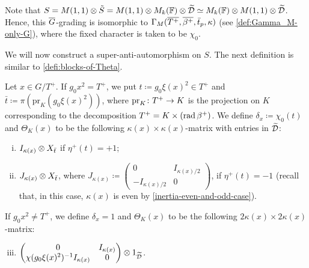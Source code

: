 \begin{remark}\label{rmk:change-M(1-1)-of-place}
    Note that $S = M(1,1) \otimes \tilde S = M(1,1) \otimes M_k(\mathbb{F}) \otimes \widetilde {\mathcal{D}} \simeq M_k(\mathbb{F}) \otimes M(1,1) \otimes \widetilde{\mathcal{D}}$. 
    Hence, this $\barr G$-grading is isomorphic to $\Gamma_M(\barr {T^+}, \barr {\beta^+}, \bar t_p, \kappa)$ (see \cref{def:Gamma_M-only-G}), where the fixed character is taken to be $\chi_0$. 
\end{remark}

We will now construct a super-anti-automorphism on $S$. 
The next definition is similar to \cref{defi:blocks-of-Theta}. 

\begin{defi}\label{defi:blocks-of-Theta-Ann}
    Let $x \in G/T^+$. 
    If $g_0x^2 = T^+$, we put $t \coloneqq g_0 \xi(x)^2 \in T^+$ and $\bar t \coloneqq \pi(\mathrm{pr}_{K} (g_0 \xi(x)^2) )$, where $\mathrm{pr}_{K}\colon {T^+} \to K$ is the projection on $K$ corresponding to the decomposition ${T^+} = K \times (\operatorname{rad} \beta^+)$. 
    We define $\delta_x \coloneqq \chi_0(t)$ and $\Theta_K(x)$ to be the following $\kappa(x) \times \kappa(x)$-matrix with entries in $\widetilde {\mathcal{D}}$:
    \begin{enumerate}[(i)]
        \item $I_{\kappa(x)} \otimes X_{\bar t}$ if $\eta^+(t) = +1$;
		\item  $J_{\kappa(x)} \otimes X_{\bar t}$, where $J_{\kappa(x)} \coloneqq \begin{pmatrix}
				      0                & I_{\kappa(x)/2} \\
				      -I_{\kappa(x)/2} & 0
			      \end{pmatrix}$, if  $\eta^+(t) = -1$ (recall that, in this case, $\kappa(x)$ is even by \cref{inertia-even-and-odd-case}). 
	\end{enumerate}
    \noindent If $g_0 x^2 \neq T^+$, we define $\delta_x = 1$ and $\Theta_K(x)$ to be the following $2\kappa(x) \times 2\kappa(x)$-matrix:
    \begin{enumerate}[(i)]
        \setcounter{enumi}{2}
		\item $\begin{pmatrix}
			0  &  I_{\kappa(x)} \\
			\chi(g_0 \xi(x)^2)^{-1} I_{\kappa(x)} & 0
		\end{pmatrix} \otimes 1_{\widetilde {\mathcal{D}}}$. 
    \end{enumerate}
\end{defi}


